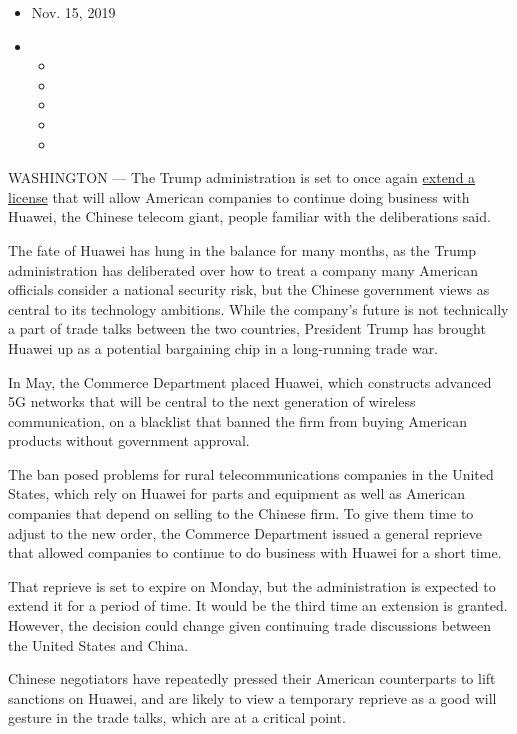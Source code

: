 \begin{itemize}
\item
  Nov. 15, 2019
\item
  \begin{itemize}
  \item
  \item
  \item
  \item
  \item
  \end{itemize}
\end{itemize}

WASHINGTON --- The Trump administration is set to once again
\href{https://www.nytimes3xbfgragh.onion/2019/08/19/us/politics/huawei-trump.html}{extend
a license} that will allow American companies to continue doing business
with Huawei, the Chinese telecom giant, people familiar with the
deliberations said.

The fate of Huawei has hung in the balance for many months, as the Trump
administration has deliberated over how to treat a company many American
officials consider a national security risk, but the Chinese government
views as central to its technology ambitions. While the company's future
is not technically a part of trade talks between the two countries,
President Trump has brought Huawei up as a potential bargaining chip in
a long-running trade war.

In May, the Commerce Department placed Huawei, which constructs advanced
5G networks that will be central to the next generation of wireless
communication, on a blacklist that banned the firm from buying American
products without government approval.

The ban posed problems for rural telecommunications companies in the
United States, which rely on Huawei for parts and equipment as well as
American companies that depend on selling to the Chinese firm. To give
them time to adjust to the new order, the Commerce Department issued a
general reprieve that allowed companies to continue to do business with
Huawei for a short time.

That reprieve is set to expire on Monday, but the administration is
expected to extend it for a period of time. It would be the third time
an extension is granted. However, the decision could change given
continuing trade discussions between the United States and China.

Chinese negotiators have repeatedly pressed their American counterparts
to lift sanctions on Huawei, and are likely to view a temporary reprieve
as a good will gesture in the trade talks, which are at a critical
point.

